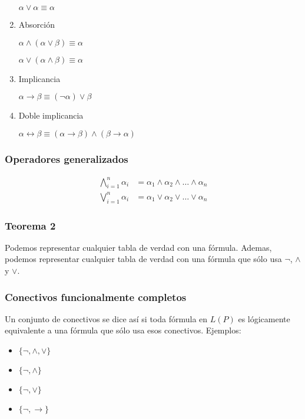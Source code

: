 \begin{multicols}{2}
\begin{enumerate}
                  $\alpha \vee \alpha \equiv \alpha$
    
            \item Absorción
    
                  $\alpha \wedge (\alpha \vee \beta) \equiv \alpha$
    
                  $\alpha \vee (\alpha \wedge \beta) \equiv \alpha$
    
            \item Implicancia
    
                  $\alpha \rightarrow \beta \equiv (\neg \alpha) \vee \beta$
    
            \item Doble implicancia
    
                  $\alpha \leftrightarrow \beta \equiv (\alpha \rightarrow \beta) \wedge (\beta \rightarrow \alpha)$
        \end{enumerate}
    
    \subsubsection*{Operadores generalizados}
    \begin{align*}
        \bigwedge_{i=1}^{n} \alpha_i & = \alpha_1 \wedge \alpha_2 \wedge \ldots \wedge \alpha_n \\
        \bigvee_{i=1}^{n} \alpha_i   & = \alpha_1 \vee \alpha_2 \vee \ldots \vee \alpha_n
    \end{align*}
    
    \subsubsection*{Teorema 2}
    Podemos representar cualquier tabla de verdad con una fórmula. Ademas, podemos representar cualquier tabla de verdad con una fórmula que sólo usa $\neg$, $\wedge$ y $\vee$.
    
    \subsubsection*{Conectivos funcionalmente completos}
    Un conjunto de conectivos se dice así si toda fórmula en $L(P)$ es lógicamente equivalente a una fórmula que sólo usa esos conectivos. Ejemplos:
    \begin{multicols}{2}
    \begin{itemize}
        \item $\{\neg, \wedge, \vee\}$
        \item $\{\neg, \wedge\}$
        \item $\{\neg, \vee\}$
        \item $\{\neg, \rightarrow\}$
    \end{itemize}
    \end{multicols}
    

\end{multicols}
